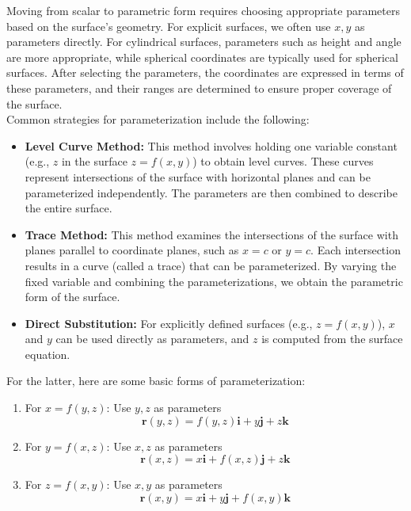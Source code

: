 \exampleline


\noindent Moving from scalar to parametric form requires choosing appropriate parameters based on the surface's geometry. For explicit surfaces, we often use $x, y$ as parameters directly. For cylindrical surfaces, parameters such as height and angle are more appropriate, while spherical coordinates are typically used for spherical surfaces. After selecting the parameters, the coordinates are expressed in terms of these parameters, and their ranges are determined to ensure proper coverage of the surface. \\

\noindent Common strategies for parameterization include the following:
\begin{itemize}
    \item \textbf{Level Curve Method:} This method involves holding one variable constant (e.g., $z$ in the surface $z = f(x, y)$) to obtain level curves. These curves represent intersections of the surface with horizontal planes and can be parameterized independently. The parameters are then combined to describe the entire surface.
    \item \textbf{Trace Method:} This method examines the intersections of the surface with planes parallel to coordinate planes, such as $x = c$ or $y = c$. Each intersection results in a curve (called a trace) that can be parameterized. By varying the fixed variable and combining the parameterizations, we obtain the parametric form of the surface.
    \item \textbf{Direct Substitution:} For explicitly defined surfaces (e.g., $z = f(x, y)$), $x$ and $y$ can be used directly as parameters, and $z$ is computed from the surface equation.
\end{itemize}


\noindent For the latter, here are some basic forms of parameterization:

\begin{enumerate}
    \item For $x = f(y,z)$: Use $y,z$ as parameters
    \[
    \mathbf{r}(y,z) = f(y,z)\mathbf{i} + y\mathbf{j} + z\mathbf{k}
    \]
    
    \item For $y = f(x,z)$: Use $x,z$ as parameters
    \[
    \mathbf{r}(x,z) = x\mathbf{i} + f(x,z)\mathbf{j} + z\mathbf{k}
    \]
    
    \item For $z = f(x,y)$: Use $x,y$ as parameters
    \[
    \mathbf{r}(x,y) = x\mathbf{i} + y\mathbf{j} + f(x,y)\mathbf{k}
    \]
\end{enumerate}

